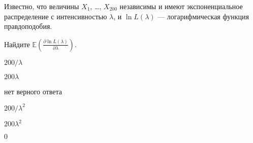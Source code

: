 
\begin{question}
Известно, что величины \(X_1\), \ldots, \(X_{200}\) независимы и имеют
экспоненциальное распределение с интенсивностью \(\lambda\), и
\(\ln L(\lambda)\) --- логарифмическая функция правдоподобия.

Найдите
\(\mathbb{E}\left(\frac{\partial \ln L(\lambda)}{\partial\lambda} \right)\).
\begin{answerlist}
  \item \(200/\lambda\)
  \item \(200\lambda\)
  \item нет верного ответа
  \item \(200/\lambda^2\)
  \item \(200\lambda^2\)
  \item \(0\)
\end{answerlist}
\end{question}


